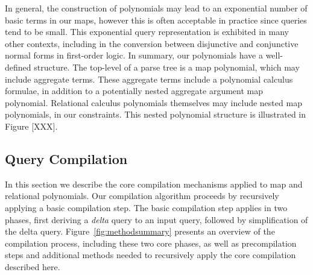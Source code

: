 In general, the construction of polynomials may lead to an exponential number of
basic terms in our maps, however this is often acceptable in practice since
queries tend to be small. This exponential query representation is exhibited in
many other contexts, including in the conversion between disjunctive and
conjunctive normal forms in first-order logic. In summary, our polynomials have
a well-defined structure. The top-level of a parse tree is a map polynomial,
which may include aggregate terms. These aggregate terms include a polynomial
calculus formulae, in addition to a potentially nested aggregate argument map
polynomial. Relational calculus polynomials themselves may include nested map
polynomials, in our constraints.  This nested polynomial structure is
illustrated in Figure [XXX].


\subsection{Query Compilation}
In this section we describe the core compilation mechanisms applied to map and
relational polynomials. Our compilation algorithm proceeds by recursively
applying a basic compilation step. The basic compilation step applies in two
phases, first deriving a \textit{delta} query to an input query, followed by
simplification of the delta query. Figure~\ref{fig:methodsummary} presents an
overview of the compilation process, including these two core phases, as well as
precompilation steps and additional methods needed to recursively apply the core
compilation described here.

